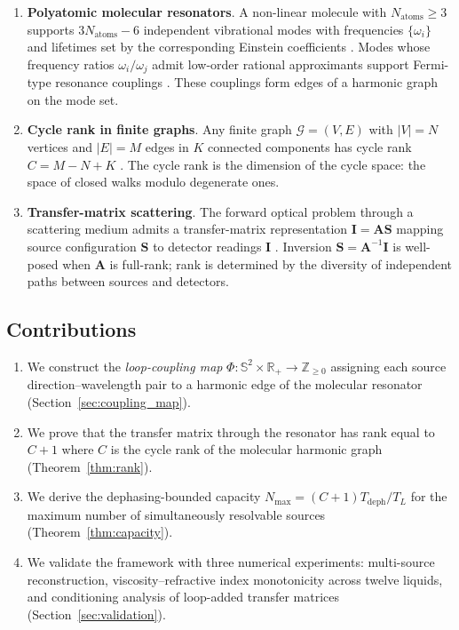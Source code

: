 \documentclass[11pt,twocolumn,a4paper]{article}
\theoremstyle{definition}
\theoremstyle{remark}
\newcommand{\Cmat}{\mathbf{A}}
\newcommand{\Ivec}{\mathbf{I}}
\newcommand{\Svec}{\mathbf{S}}
\newcommand{\Graph}{\mathcal{G}}
\newcommand{\VertexSet}{V}
\newcommand{\EdgeSet}{E}
\begin{document}
\begin{enumerate}[nosep]
\item \textbf{Polyatomic molecular resonators}. A non-linear molecule with $N_{\mathrm{atoms}} \geq 3$ supports $3N_{\mathrm{atoms}} - 6$ independent vibrational modes with frequencies $\{\omega_i\}$ and lifetimes set by the corresponding Einstein coefficients \citep{herzberg1945,wilson1955}. Modes whose frequency ratios $\omega_i / \omega_j$ admit low-order rational approximants support Fermi-type resonance couplings \citep{fermi1931}. These couplings form edges of a harmonic graph on the mode set.
\item \textbf{Cycle rank in finite graphs}. Any finite graph $\Graph = (\VertexSet, \EdgeSet)$ with $|\VertexSet| = N$ vertices and $|\EdgeSet| = M$ edges in $K$ connected components has cycle rank $C = M - N + K$ \citep{diestel2017}. The cycle rank is the dimension of the cycle space: the space of closed walks modulo degenerate ones.
\item \textbf{Transfer-matrix scattering}. The forward optical problem through a scattering medium admits a transfer-matrix representation $\Ivec = \Cmat \Svec$ mapping source configuration $\Svec$ to detector readings $\Ivec$ \citep{popoff2010,pendry1994,yeh1988}. Inversion $\Svec = \Cmat^{-1}\Ivec$ is well-posed when $\Cmat$ is full-rank; rank is determined by the diversity of independent paths between sources and detectors.
\end{enumerate}

\subsection{Contributions}

\begin{enumerate}[nosep]
\item We construct the \emph{loop-coupling map} $\Phi: \mathbb{S}^2 \times \mathbb{R}_+ \to \mathbb{Z}_{\geq 0}$ assigning each source direction--wavelength pair to a harmonic edge of the molecular resonator (Section~\ref{sec:coupling_map}).
\item We prove that the transfer matrix through the resonator has rank equal to $C+1$ where $C$ is the cycle rank of the molecular harmonic graph (Theorem~\ref{thm:rank}).
\item We derive the dephasing-bounded capacity $N_{\max} = (C+1) T_{\mathrm{deph}}/T_L$ for the maximum number of simultaneously resolvable sources (Theorem~\ref{thm:capacity}).
\item We validate the framework with three numerical experiments: multi-source reconstruction, viscosity--refractive index monotonicity across twelve liquids, and conditioning analysis of loop-added transfer matrices (Section~\ref{sec:validation}).
\end{enumerate}
\end{document}
